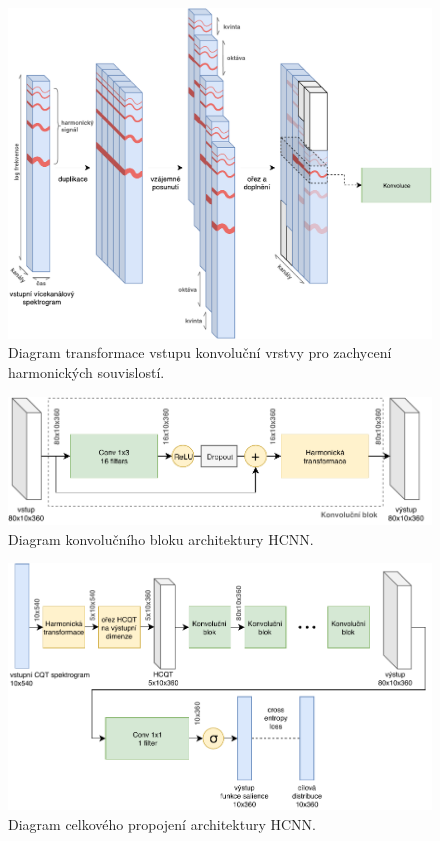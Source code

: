 \begin{figure}[h]\centering
    \includegraphics[width=\textwidth,height=\textheight,keepaspectratio]{../img/hcnn_harmonic_stacking_2}
\caption{Diagram transformace vstupu konvoluční vrstvy pro zachycení harmonických souvislostí.}\label{obr:hcnn_harmonic_stacking}
\end{figure}

\begin{figure}[h]\centering
    \includegraphics[width=\textwidth,height=\textheight,keepaspectratio]{../img/hcnn_layer}
\caption{Diagram konvolučního bloku architektury HCNN.}\label{obr:hcnn_layer}
\end{figure}

\begin{figure}[h]\centering
    \includegraphics[width=\textwidth,height=\textheight,keepaspectratio]{../img/hcnn_arch}
\caption{Diagram celkového propojení architektury HCNN.}\label{obr:hcnn_arch}
\end{figure}

